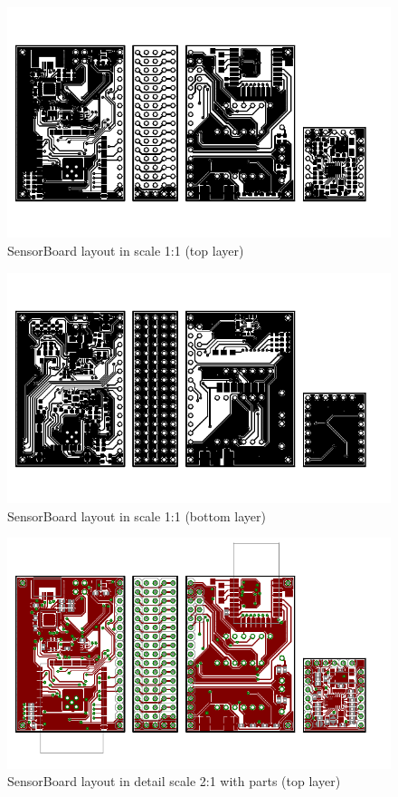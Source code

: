 \begin{figure}
	\centering
	\includegraphics[scale=1]{img/brdTop.pdf}
	\caption{SensorBoard layout in scale 1:1 (top layer)}
	\label{brdTop}
\end{figure}

\begin{figure}
	\centering
	\includegraphics[scale=1]{img/brdBottom.pdf}
	\caption{SensorBoard layout in scale 1:1 (bottom layer)}
	\label{brdBottom}
\end{figure}

\begin{figure}
	\centering
	\includegraphics[angle=90, scale=2]{img/brdCTop.pdf}
	\caption{SensorBoard layout in detail scale 2:1 with parts (top layer)}
	\label{brdTopC}
\end{figure}

